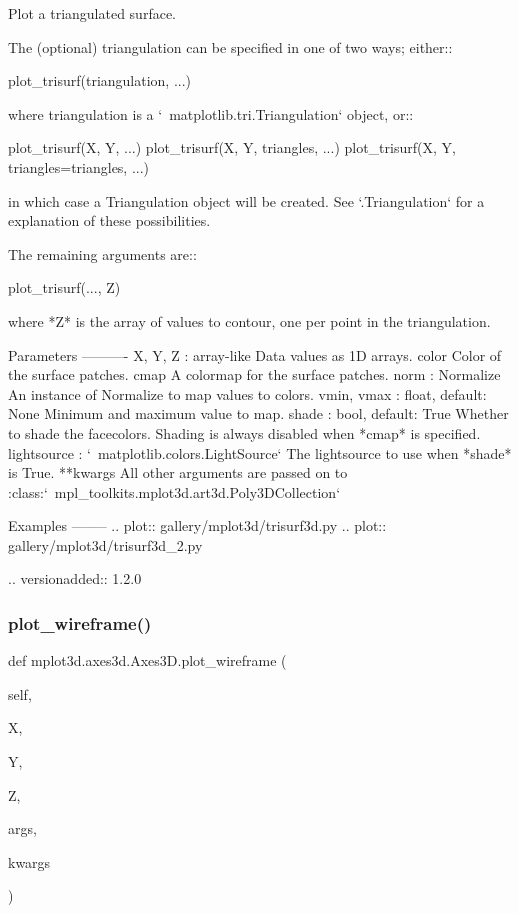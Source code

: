 \begin{DoxyVerb}
\begin{DoxyVerb}Plot a triangulated surface.

The (optional) triangulation can be specified in one of two ways;
either::

  plot_trisurf(triangulation, ...)

where triangulation is a `~matplotlib.tri.Triangulation` object, or::

  plot_trisurf(X, Y, ...)
  plot_trisurf(X, Y, triangles, ...)
  plot_trisurf(X, Y, triangles=triangles, ...)

in which case a Triangulation object will be created.  See
`.Triangulation` for a explanation of these possibilities.

The remaining arguments are::

  plot_trisurf(..., Z)

where *Z* is the array of values to contour, one per point
in the triangulation.

Parameters
----------
X, Y, Z : array-like
    Data values as 1D arrays.
color
    Color of the surface patches.
cmap
    A colormap for the surface patches.
norm : Normalize
    An instance of Normalize to map values to colors.
vmin, vmax : float, default: None
    Minimum and maximum value to map.
shade : bool, default: True
    Whether to shade the facecolors.  Shading is always disabled when
    *cmap* is specified.
lightsource : `~matplotlib.colors.LightSource`
    The lightsource to use when *shade* is True.
**kwargs
    All other arguments are passed on to
    :class:`~mpl_toolkits.mplot3d.art3d.Poly3DCollection`

Examples
--------
.. plot:: gallery/mplot3d/trisurf3d.py
.. plot:: gallery/mplot3d/trisurf3d_2.py

.. versionadded:: 1.2.0
\end{DoxyVerb}
 \mbox{\label{classmplot3d_1_1axes3d_1_1Axes3D_ac7a2ef822768bc60ba66561271bfde03}} 
\subsubsection{\texorpdfstring{plot\+\_\+wireframe()}{plot\_wireframe()}}
{\footnotesize\ttfamily def mplot3d.\+axes3d.\+Axes3\+D.\+plot\+\_\+wireframe (\begin{DoxyParamCaption}\item[{}]{self,  }\item[{}]{X,  }\item[{}]{Y,  }\item[{}]{Z,  }\item[{}]{args,  }\item[{}]{kwargs }\end{DoxyParamCaption})}


\end{DoxyVerb}
